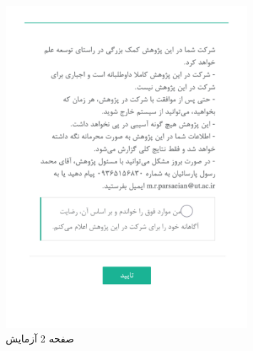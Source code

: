  
\begin{figure}[htpb]
\centering
\includegraphics[width=0.8\textwidth,height=0.8\textheight,keepaspectratio]{./img/Task2.png}
\caption{ صفحه 2 آزمایش }
\label{fig:Task2}
\end{figure}
 
